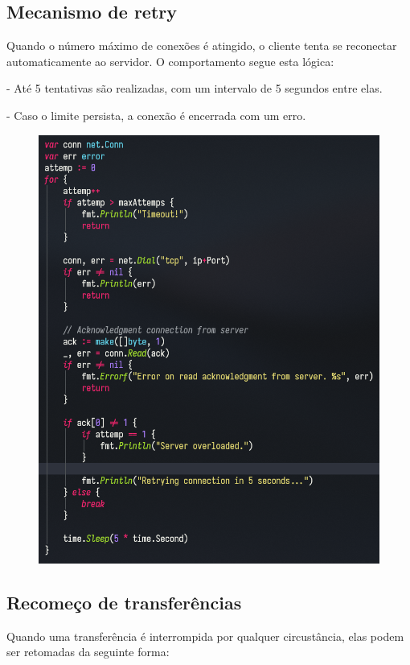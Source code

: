 \documentclass{article}
\begin{document}
\subsection*{Mecanismo de retry}
Quando o número máximo de conexões é atingido, o cliente tenta se reconectar automaticamente ao servidor. O comportamento segue esta lógica:

- Até 5 tentativas são realizadas, com um intervalo de 5 segundos entre elas.

- Caso o limite persista, a conexão é encerrada com um erro.

\begin{figure}[H]
	\centering
	\includegraphics[scale=0.5]{retry.png}
\end{figure}

\subsection*{Recomeço de transferências}
Quando uma transferência é interrompida por qualquer circustância, elas podem ser retomadas da seguinte forma:
\end{document}

